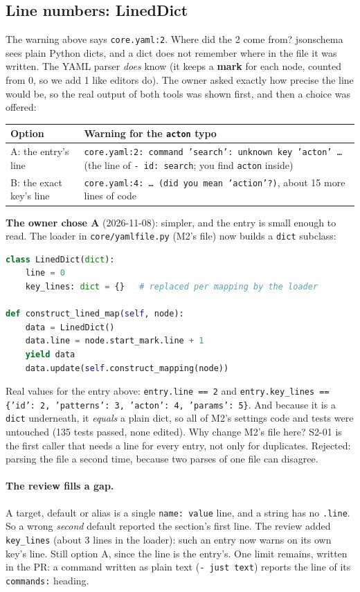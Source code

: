 \documentclass[11pt,a4paper]{article}
\begin{document}
\subsection{Line numbers: LinedDict}
The warning above says \texttt{core.yaml:2}. Where did the 2 come from? jsonschema sees plain
Python dicts, and a dict does not remember where in the file it was written. The YAML parser
\emph{does} know (it keeps a \textbf{mark} for each node, counted from 0, so we add 1 like
editors do). The owner asked exactly how precise the line would be, so the real output of both
tools was shown first, and then a choice was offered:
\begin{center}
\begin{tabularx}{\textwidth}{l X}
\toprule
\textbf{Option} & \textbf{Warning for the \texttt{acton} typo} \\
\midrule
A: the entry's line & \texttt{core.yaml:2: command 'search': unknown key 'acton' \ldots{}}
   (the line of \texttt{- id: search}; you find \texttt{acton} inside) \\
B: the exact key's line & \texttt{core.yaml:4: \ldots{} (did you mean 'action'?)}, about 15
   more lines of code \\
\bottomrule
\end{tabularx}
\end{center}
\noindent \textbf{The owner chose A} (2026-11-08): simpler, and the entry is small enough to read.
The loader in \texttt{core/yamlfile.py} (M2's file) now builds a \texttt{dict} subclass:
\begin{lstlisting}[language=Python]
class LinedDict(dict):
    line = 0
    key_lines: dict = {}   # replaced per mapping by the loader

def construct_lined_map(self, node):
    data = LinedDict()
    data.line = node.start_mark.line + 1
    yield data
    data.update(self.construct_mapping(node))
\end{lstlisting}
\noindent Real values for the entry above: \texttt{entry.line == 2} and
\texttt{entry.key\_lines == \{'id': 2, 'patterns': 3, 'acton': 4, 'params': 5\}}. And because it
is a \texttt{dict} underneath, it \emph{equals} a plain dict, so all of M2's settings code and
tests were untouched (135 tests passed, none edited). Why change M2's file here? S2-01 is the first
caller that needs a line for every entry, not only for duplicates. Rejected: parsing the file
a second time, because two parses of one file can disagree.

\paragraph{The review fills a gap.} A target, default or alias is a single \texttt{name: value}
line, and a string has no \texttt{.line}. So a wrong \emph{second} default reported the section's
first line. The review added \texttt{key\_lines} (about 3 lines in the loader): such an entry now
warns on its own key's line. Still option A, since the line is the entry's. One limit remains,
written in the PR: a command written as plain text (\texttt{- just text}) reports the line of its
\texttt{commands:} heading.
\end{document}
